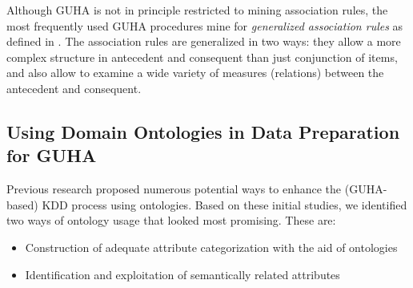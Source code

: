Although GUHA is not in principle restricted to mining association rules, the most frequently used GUHA procedures mine for \emph{generalized association rules} as defined in \cite{Rauch}. 
The association rules are generalized in two ways: they allow a more complex structure in antecedent and consequent than just conjunction of items, and also allow to examine a wide variety of measures (relations) between the antecedent and consequent.





\subsection{Using Domain Ontologies in Data Preparation for GUHA}
\label{OntologiesDataPrep}

Previous research \cite{Cespivova,Ralbovsky} proposed numerous potential ways to enhance the (GUHA-based) KDD process using ontologies. 
Based on these initial studies, we identified two ways of ontology usage that looked most promising. 
These are:
\begin{itemize}
	\item Construction of adequate attribute categorization with the aid of ontologies
	\item Identification and exploitation of semantically related attributes
\end{itemize}

